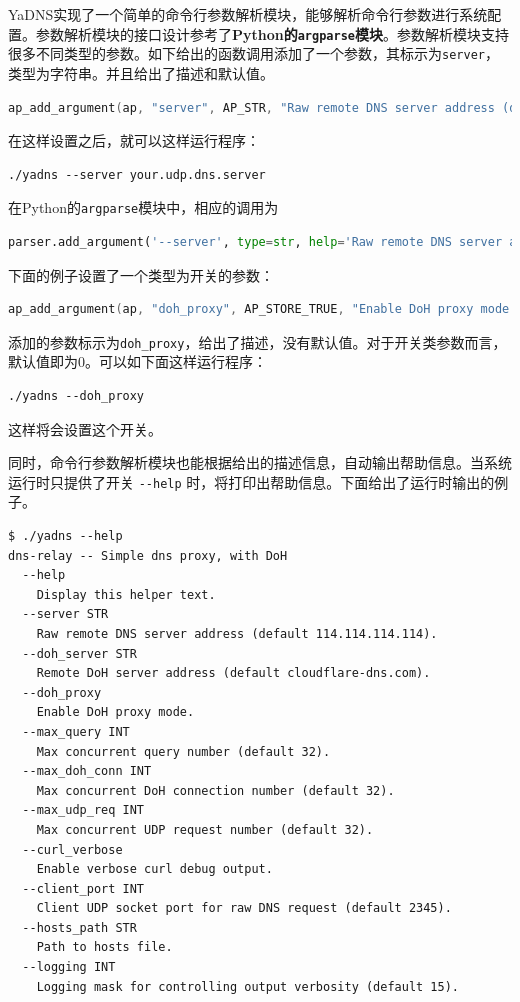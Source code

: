 YaDNS实现了一个简单的命令行参数解析模块，能够解析命令行参数进行系统配置。参数解析模块的接口设计参考了\textbf{Python的\lstinline{argparse}模块}。参数解析模块支持很多不同类型的参数。如下给出的函数调用添加了一个参数，其标示为\lstinline{server}，类型为字符串。并且给出了描述和默认值。
\begin{lstlisting}[language=C]
ap_add_argument(ap, "server", AP_STR, "Raw remote DNS server address (default 114.114.114.114).", "114.114.114.114");
\end{lstlisting}
在这样设置之后，就可以这样运行程序：
\begin{verbatim}
./yadns --server your.udp.dns.server
\end{verbatim}
在Python的\lstinline{argparse}模块中，相应的调用为
\begin{lstlisting}[language=Python]
parser.add_argument('--server', type=str, help='Raw remote DNS server address (default 114.114.114.114).', default='114.114.114.114')
\end{lstlisting}

下面的例子设置了一个类型为开关的参数：
\begin{lstlisting}[language=C]
ap_add_argument(ap, "doh_proxy", AP_STORE_TRUE, "Enable DoH proxy mode.", 0);
\end{lstlisting}
添加的参数标示为\lstinline{doh_proxy}，给出了描述，没有默认值。对于开关类参数而言，默认值即为0。可以如下面这样运行程序：
\begin{verbatim}
./yadns --doh_proxy
\end{verbatim}
这样将会设置这个开关。

同时，命令行参数解析模块也能根据给出的描述信息，自动输出帮助信息。当系统运行时只提供了开关 \lstinline{--help} 时，将打印出帮助信息。下面给出了运行时输出的例子。
\begin{verbatim}
$ ./yadns --help
dns-relay -- Simple dns proxy, with DoH
  --help
    Display this helper text.
  --server STR
    Raw remote DNS server address (default 114.114.114.114).
  --doh_server STR
    Remote DoH server address (default cloudflare-dns.com).
  --doh_proxy
    Enable DoH proxy mode.
  --max_query INT
    Max concurrent query number (default 32).
  --max_doh_conn INT
    Max concurrent DoH connection number (default 32).
  --max_udp_req INT
    Max concurrent UDP request number (default 32).
  --curl_verbose
    Enable verbose curl debug output.
  --client_port INT
    Client UDP socket port for raw DNS request (default 2345).
  --hosts_path STR
    Path to hosts file.
  --logging INT
    Logging mask for controlling output verbosity (default 15).
\end{verbatim}
















